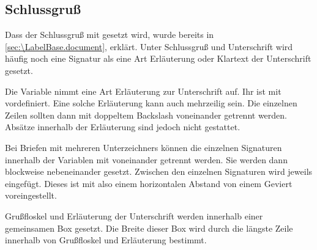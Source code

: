 \subsection{Schlussgruß}
\BeginIndexGroup
{}%

Dass der Schlussgruß mit 
gesetzt wird, wurde bereits in \autoref{sec:\LabelBase.document},
 erklärt. %
\iffalse %
Unter dem Schlussgruß wird häufig noch eine Signatur, eine Art Erläuterung zur
Unterschrift, gesetzt. Die Unterschrift wiederum findet Platz zwischen dem
Schlussgruß und der Signatur.%
\else%
Unter Schlussgruß und Unterschrift wird häufig noch eine Signatur als eine Art
Erläuterung oder Klartext der Unterschrift gesetzt.%
\fi%

\begin{Declaration}
\end{Declaration}
Die Variable  nimmt eine Art Erläuterung
zur Unterschrift auf. Ihr  ist mit
 vordefiniert. Eine
solche Erläuterung kann auch mehrzeilig sein. Die einzelnen Zeilen sollten
dann mit doppeltem Backslash voneinander getrennt
werden. Absätze innerhalb der Erläuterung sind jedoch nicht
gestattet.

Bei Briefen mit
mehreren Unterzeichners können die einzelnen Signaturen innerhalb der
Variablen  mit  voneinander getrennt
werden. Sie werden dann blockweise nebeneinander gesetzt. Zwischen den
einzelnen Signaturen wird jeweils  eingefügt. Dieses ist mit
 also einem horizontalen Abstand von einem Geviert voreingestellt.%
\EndIndexGroup


\begin{Declaration}
\end{Declaration}
Grußfloskel und Erläuterung der
Unterschrift werden innerhalb einer gemeinsamen Box
gesetzt.  Die Breite dieser Box wird durch die längste Zeile innerhalb von
Grußfloskel und Erläuterung bestimmt.

